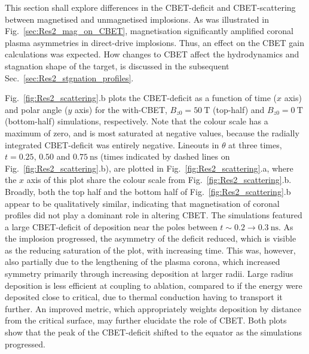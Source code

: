 This section shall explore differences in the \ac{CBET}-deficit and \ac{CBET}-scattering between magnetised and unmagnetised implosions.
As was illustrated in Fig.~\ref{sec:Res2_mag_on_CBET}, magnetisation significantly amplified coronal plasma asymmetries in direct-drive implosions.
Thus, an effect on the \ac{CBET} gain calculations was expected.
How changes to \ac{CBET} affect the hydrodynamics and stagnation shape of the target, is discussed in the subsequent Sec.~\ref{sec:Res2_stgnation_profiles}.

Fig.~\ref{fig:Res2_scattering}.b plots the \ac{CBET}-deficit as a function of time ($x$ axis) and polar angle ($y$ axis) for the with-\ac{CBET}, $B_{z0}=50\ \text{T}$ (top-half) and $B_{z0}=0\ \text{T}$ (bottom-half) simulations, respectively.
Note that the colour scale has a maximum of zero, and is most saturated at negative values, because the radially integrated \ac{CBET}-deficit was entirely negative.
Lineouts in $\theta$ at three times, $t=0.25$, $0.50$ and $0.75\ \text{ns}$ (times indicated by dashed lines on Fig.~\ref{fig:Res2_scattering}.b), are plotted in Fig.~\ref{fig:Res2_scattering}.a, where the $x$ axis of this plot share the colour scale from Fig.~\ref{fig:Res2_scattering}.b.
Broadly, both the top half and the bottom half of Fig.~\ref{fig:Res2_scattering}.b appear to be qualitatively similar, indicating that magnetisation of coronal profiles did not play a dominant role in altering \ac{CBET}.
The simulations featured a large \ac{CBET}-deficit of deposition near the poles between $t\sim0.2\rightarrow0.3\ \text{ns}$.
As the implosion progressed, the asymmetry of the deficit reduced, which is visible as the reducing saturation of the plot, with increasing time.
This was, however, also partially due to the lengthening of the plasma corona, which increased symmetry primarily through increasing deposition at larger radii.
Large radius deposition is less efficient at coupling to ablation, compared to if the energy were deposited close to critical, due to thermal conduction having to transport it further.
An improved metric, which appropriately weights deposition by distance from the critical surface, may further elucidate the role of \ac{CBET}.
Both plots show that the peak of the \ac{CBET}-deficit shifted to the equator as the simulations progressed.

